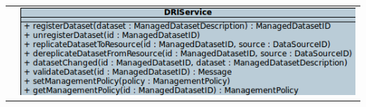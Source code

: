 \documentclass[9pt]{beamer}
\begin{document}
\begin{frame}
\begin{tabular}{l l}
\begin{minipage}{0.4\textwidth}
	\end{minipage}
	&
	\begin{minipage}{0.6\textwidth}
		\includegraphics[width=0.6\paperwidth]{img/dri_interface.png}
	\end{minipage}
\end{tabular}
\end{frame}

\end{document}
